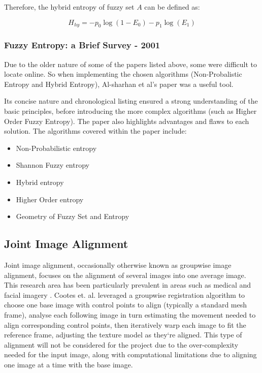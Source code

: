 Therefore, the hybrid entropy of fuzzy set $A$ can be defined as:

\begin{equation}
  H_{hy} = -p_0\log(1 - E_0) - p_1\log(E_1)
\end{equation}

\subsubsection{Fuzzy Entropy: a Brief Survey - 2001}

Due to the older nature of some of the papers listed above, some were difficult to locate online. So when implementing the chosen algorithms (Non-Probalistic Entropy and Hybrid Entropy), Al-sharhan et al's paper  \cite{Al-Sharhan_Karray_Gueaieb_Basir_2001} was a useful tool.

Its concise nature and chronological listing ensured a strong understanding of the basic principles, before introducing the more complex algorithms (such as Higher Order Fuzzy Entropy). The paper also highlights advantages and flaws to each solution. The algorithms covered within the paper include:

\begin{itemize}
  \item Non-Probabilistic entropy
  \item Shannon Fuzzy entropy
  \item Hybrid entropy
  \item Higher Order entropy
  \item Geometry of Fuzzy Set and Entropy
\end{itemize}

\subsection{Joint Image Alignment}

Joint image alignment, occasionally otherwise known as groupwise image alignment, focuses on the alignment of several images into one average image. This research area has been particularly prevalent in areas such as medical and facial imagery \cite{Tiddeman_Hunter_2011} \cite{Cootes_Twining_Petrovic_Babalola_Taylor_2010}. Cootes et. al. leveraged a groupwise registration algorithm to choose one base image with control points to align (typically a standard mesh frame), analyse each following image in turn estimating the movement needed to align corresponding control points, then iteratively warp each image to fit the reference frame, adjusting the texture model as they`re aligned. This type of alignment will not be considered for the project due to the over-complexity needed for the input image, along with computational limitations due to aligning one image at a time with the base image.

